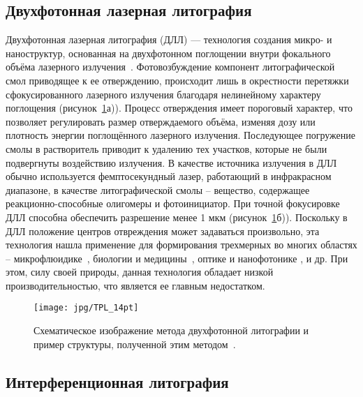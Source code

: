 \subsection{Двухфотонная лазерная литография}

Двухфотонная лазерная литография (ДЛЛ) — технология создания микро- и наноструктур, основанная на двухфотонном поглощении внутри фокального объёма лазерного излучения~\cite{Hohmann2015, Kawata2001}. Фотовозбуждение компонент литографической смол приводящее к ее отверждению, происходит лишь в окрестности перетяжки сфокусированного лазерного излучения благодаря нелинейному характеру поглощения (рисунок~\ref{fig:TPL}а)). Процесс отверждения имеет пороговый характер, что позволяет регулировать размер отверждаемого объёма, изменяя дозу или плотность энергии поглощённого лазерного излучения. Последующее погружение смолы в растворитель приводит к удалению тех участков, которые не были подвергнуты воздействию излучения. В качестве источника излучения в ДЛЛ обычно используется фемптосекундный лазер, работающий в инфракрасном диапазоне, в качестве литографической смолы -- вещество, содержащее реакционно-способные олигомеры и фотоинициатор. При точной фокусировке ДЛЛ способна обеспечить разрешение менее 1 мкм (рисунок~\ref{fig:TPL}б)). Поскольку в ДЛЛ положение центров отвреждения может задаваться произвольно, эта технология нашла применение для формирования трехмерных во многих областях -- микрофлюидике~\cite{TPL_microfluidics_1, TPL_microfluidics_2}, биологии и \break медицины~\cite{TPL_biology_1, TPL_biology_2}, оптике и нанофотонике \cite{TPL_optics, TPL_nanophotonics}, и др. При этом, силу своей природы, данная технология обладает низкой производительностью, что является ее главным недостатком.

\begin{figure}
	\centering
	\texttt{[image: jpg/TPL\_14pt]}
	\caption{Схематическое изображение метода двухфотонной литографии и пример структуры, полученной этим методом~\cite{TPL_castle}.}
	\label{fig:TPL}
\end{figure}


\subsection{Интерференционная литография}

